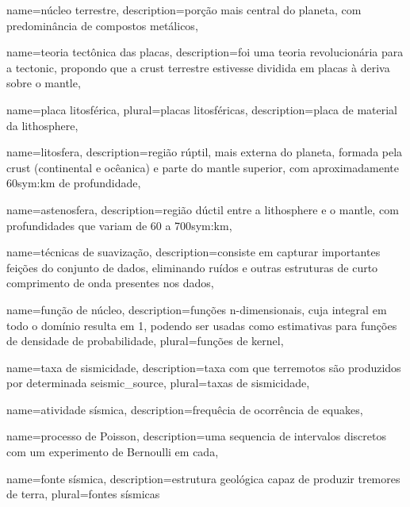 {
	name={n{ú}cleo terrestre},
	description={por{ç}{ã}o mais central do planeta, com predomin{â}ncia de compostos metálicos},
}

{
	name={teoria tect{ô}nica das placas},
	description={foi uma teoria revolucionária para a \gls{tectonic},
				propondo que a \gls{crust} terrestre estivesse dividida 
				em placas {à} deriva sobre o \gls{mantle}},
}


{
	name={placa litosf{é}rica},
	plural={placas litosf{é}ricas},
	description={placa de material da \gls{lithosphere}},
}


{
	name={litosfera},
	description={região rúptil, mais externa do planeta, formada pela \gls{crust} 
		(continental e ocêanica) e parte do \gls{mantle} superior, com aproximadamente 
		60\gls*{sym:km} de profundidade},
}


{
	name={astenosfera},
	description={região dúctil entre a \gls{lithosphere} e o \gls{mantle},
				com profundidades que variam de 60 a 700\gls*{sym:km}},
}

{
	name={técnicas de suavização},
	description={consiste em capturar importantes feições do conjunto de dados,
				 eliminando ruídos e outras estruturas de curto comprimento de onda
				 presentes nos dados},
}

{
	name={função de núcleo},
	description={funções n-dimensionais, cuja integral em todo o domínio resulta em 1,
				 podendo ser usadas como estimativas para 
				 funções de densidade de probabilidade},
	plural={funções de kernel},
}

{
	name={taxa de sismicidade},
	description={taxa com que terremotos são produzidos por determinada \gls{seismic_source}},
	plural={taxas de sismicidade},
}

{
	name={atividade sísmica},
	description={frequ{ê}cia de ocorr{ê}ncia de \glspl{equake}},
}

{
	name={processo de Poisson},
	description={uma sequencia de intervalos discretos com um experimento de Bernoulli em cada},
}

{
	name={fonte sísmica},
	description={estrutura geológica capaz de produzir tremores de terra},
	plural={fontes sísmicas}
}

